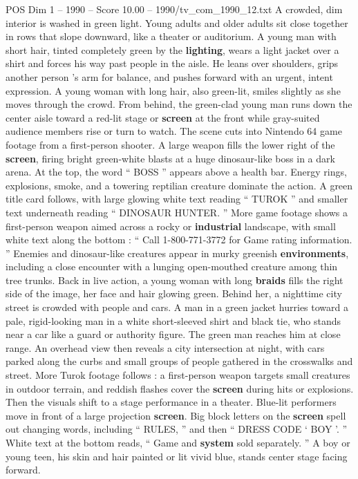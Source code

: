 \begin{textsample}{POS Dim 1 – 1990 – Score 10.00 – 1990/tv\_com\_1990\_12.txt}  \label{ex:f1_pos_043}
A crowded, dim interior is washed in green light.
Young adults and older adults sit close together in rows that slope downward, like a theater or auditorium.
A young man with short hair, tinted completely green by the \textbf{lighting}, wears a light jacket over a shirt and forces his way past people in the aisle.
He leans over shoulders, grips another person ’s arm for balance, and pushes forward with an urgent, intent expression.
A young woman with long hair, also green-lit, smiles slightly as she moves through the crowd.
From behind, the green-clad young man runs down the center aisle toward a red-lit stage or \textbf{screen} at the front while gray-suited audience members rise or turn to watch.
The scene cuts into Nintendo 64 game footage from a first-person shooter.
A large weapon fills the lower right of the \textbf{screen}, firing bright green-white blasts at a huge dinosaur-like boss in a dark arena.
At the top, the word “ BOSS ” appears above a health bar.
Energy rings, explosions, smoke, and a towering reptilian creature dominate the action.
A green title card follows, with large glowing white text reading “ TUROK ” and smaller text underneath reading “ DINOSAUR HUNTER. ” More game footage shows a first-person weapon aimed across a rocky or \textbf{industrial} landscape, with small white text along the bottom : “ Call 1-800-771-3772 for Game rating information. ” Enemies and dinosaur-like creatures appear in murky greenish \textbf{environments}, including a close encounter with a lunging open-mouthed creature among thin tree trunks.
Back in live action, a young woman with long \textbf{braids} fills the right side of the image, her face and hair glowing green.
Behind her, a nighttime city street is crowded with people and cars.
A man in a green jacket hurries toward a pale, rigid-looking man in a white short-sleeved shirt and black tie, who stands near a car like a guard or authority figure.
The green man reaches him at close range.
An overhead view then reveals a city intersection at night, with cars parked along the curbs and small groups of people gathered in the crosswalks and street.
More Turok footage follows : a first-person weapon targets small creatures in outdoor terrain, and reddish flashes cover the \textbf{screen} during hits or explosions.
Then the visuals shift to a stage performance in a theater.
Blue-lit performers move in front of a large projection \textbf{screen}.
Big block letters on the \textbf{screen} spell out changing words, including “ RULES, ” and then “ DRESS CODE ‘ BOY ’. ” White text at the bottom reads, “ Game and \textbf{system} sold separately. ” A boy or young teen, his skin and hair painted or lit vivid blue, stands center stage facing forward.

\end{textsample}
